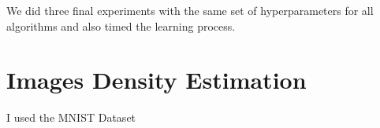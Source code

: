 
\newpage

We did three final experiments with the same set of hyperparameters for all algorithms and also timed the 
learning process. 

\newpage
\section{Images Density Estimation}

I used the MNIST Dataset \cite{mnist} 


